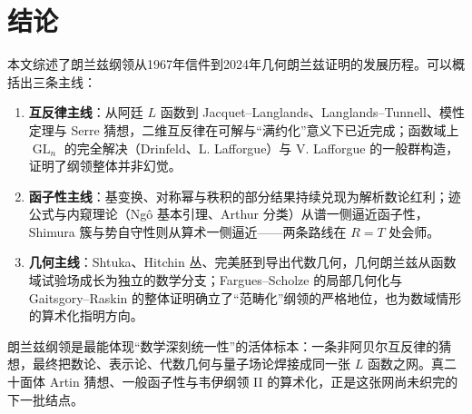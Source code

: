 \section{结论}\label{sec:conclusion}

本文综述了朗兰兹纲领从1967年信件到2024年几何朗兰兹证明的发展历程。可以概括出三条主线：

\begin{enumerate}[label=(\arabic*)]
    \item \textbf{互反律主线}：从阿廷 $L$ 函数到 Jacquet--Langlands、Langlands--Tunnell、模性定理与 Serre 猜想，二维互反律在可解与“满约化”意义下已近完成；函数域上 $\operatorname{GL}_n$ 的完全解决（Drinfeld、L. Lafforgue）与 V. Lafforgue 的一般群构造，证明了纲领整体并非幻觉。
    \item \textbf{函子性主线}：基变换、对称幂与秩积的部分结果持续兑现为解析数论红利；迹公式与内窥理论（Ng\^o 基本引理、Arthur 分类）从谱一侧逼近函子性，Shimura 簇与势自守性则从算术一侧逼近——两条路线在 $R=T$ 处会师。
    \item \textbf{几何主线}：Shtuka、Hitchin 丛、完美胚到导出代数几何，几何朗兰兹从函数域试验场成长为独立的数学分支；Fargues--Scholze 的局部几何化与 Gaitsgory--Raskin 的整体证明确立了“范畴化”纲领的严格地位，也为数域情形的算术化指明方向。
\end{enumerate}

朗兰兹纲领是最能体现“数学深刻统一性”的活体标本：一条非阿贝尔互反律的猜想，最终把数论、表示论、代数几何与量子场论焊接成同一张 $L$ 函数之网。真二十面体 Artin 猜想、一般函子性与韦伊纲领 II 的算术化，正是这张网尚未织完的下一批结点。
